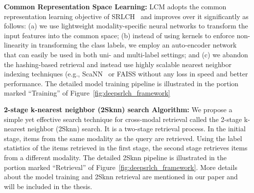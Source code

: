 \noindent\textbf{Common Representation Space Learning:}
LCM adopts the common representation learning objective of SRLCH~\cite{srlch} and improves over it significantly as follows: (a) we use lightweight modality-specific neural networks to transform the input features into the common space; (b) instead of using kernels to enforce non-linearity in transforming the class labels, we employ an auto-encoder network that can easily be used in both uni- and multi-label settings; and (c) we abandon the hashing-based retrieval and instead use highly scalable nearest neighbor indexing techniques (e.g., ScaNN~\cite{avq_2020} or FAISS without any loss in speed and better performance. The detailed model training pipeline is illustrated in the portion marked ``Training'' of Figure~\ref{fig:deepsrlch_framework} 

\noindent\textbf{2-stage k-nearest neighbor (2Sknn) search Algorithm:} \label{lbl:fault_tolerant_nn_search}
We propose a simple yet effective search technique for cross-modal retrieval called the 2-stage k-nearest neighbor (2Sknn) search. It is a two-stage retrieval process.
In the initial stage, items from the same modality as the query are retrieved. Using the label statistics of the items retrieved in the first stage, the second stage retrieves items from a different modality.
The detailed 2Sknn pipeline is illustrated in the portion marked ``Retrieval'' of Figure~\ref{fig:deepsrlch_framework}. More details about the model training and 2Sknn retrieval are mentioned in our paper \cite{dwijesh} and will be included in the thesis.

